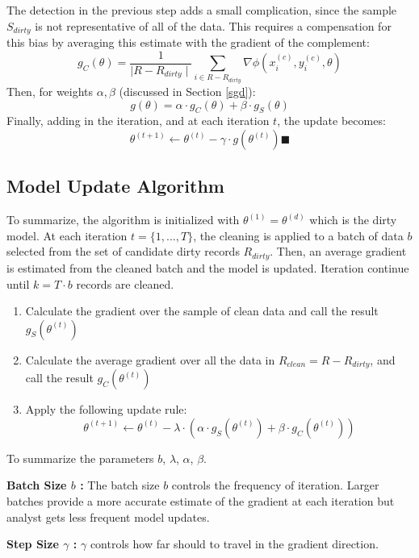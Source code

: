 The detection in the previous step adds a small complication, since the sample $S_{dirty}$ is not representative of all of the data.
This requires a compensation for this bias by averaging this estimate with the gradient of the complement:
\[
g_C(\theta) = \frac{1}{\mid R - R_{dirty}\mid}\sum_{i \in R - R_{dirty}}\nabla\phi(x_i^{(c)},y_i^{(c)},\theta)
\]
Then, for weights $\alpha,\beta$ (discussed in Section \ref{sgd}):
\[
g(\theta) = \alpha \cdot g_C(\theta) + \beta \cdot g_S(\theta)
\]
Finally, adding in the iteration, and at each iteration $t$, the update becomes:
\[
\theta^{(t+1)} \leftarrow \theta^{(t)} - \gamma \cdot g(\theta^{(t)}) \blacksquare
\]

\subsection{Model Update Algorithm}
To summarize, the algorithm is initialized with $\theta^{(1)} = \theta^{(d)}$ which is the dirty model.
At each iteration $t=\{1,...,T\}$, the cleaning is applied to a batch of data $b$ selected from the set of candidate dirty records $R_{dirty}$.
Then, an average gradient is estimated from the cleaned batch and the model is updated.
Iteration continue until $k = T \cdot b$ records are cleaned.

\begin{enumerate}[noitemsep]
	\item Calculate the gradient over the sample of clean data and call the result $g_S(\theta^{(t)})$
	\item Calculate the average gradient over all the data in $R_{clean}=R-R_{dirty}$, and call the result $g_C(\theta^{(t)})$
	\item Apply the following update rule:
	\[
	\theta^{(t+1)} \leftarrow \theta^{(t)} - \lambda \cdot(\alpha\cdot g_S(\theta^{(t)}) + \beta \cdot  g_C(\theta^{(t)}))
	\]
\end{enumerate} 

\noindent To summarize the parameters $b$, $\lambda$, $\alpha$, $\beta$.

\vspace{0.25em}

\noindent\textbf{Batch Size $b$ : } The batch size $b$ controls the frequency of iteration. Larger batches provide a more accurate estimate of the gradient at each iteration but analyst gets less frequent model updates. 

\vspace{0.25em}

\noindent\textbf{Step Size $\gamma$ : } $\gamma$ controls how far should to travel in the gradient direction.

